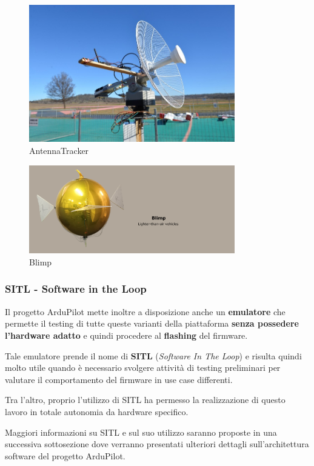 \documentclass[a4paper, 12pt, oneside]{article}
\theoremstyle{definition}
\begin{document}
\begin{figure}[H]
    \centering
    \includegraphics[width=0.8\textwidth]{images/antenna.jpg}
    \caption{AntennaTracker}
\end{figure}
\begin{figure}[H]
    \centering
    \includegraphics[width=0.8\textwidth]{images/blimp.png}
    \caption{Blimp}
\end{figure}

\subsubsection{SITL - Software in the Loop}
Il progetto ArduPilot mette inoltre a disposizione anche un \textbf{emulatore} che permette il testing di tutte queste varianti della piattaforma \textbf{senza possedere l'hardware adatto} \cite{sitl} e quindi procedere al \textbf{flashing} del firmware. 

Tale emulatore prende il nome di \textbf{SITL} (\textit{Software In The Loop}) e risulta quindi molto utile quando è necessario svolgere attività di testing preliminari per valutare il comportamento del firmware in use case differenti. 

Tra l'altro, proprio l'utilizzo di SITL ha permesso la realizzazione di questo lavoro in totale autonomia da hardware specifico. 

Maggiori informazioni su SITL e sul suo utilizzo saranno proposte in una successiva sottosezione dove verranno presentati ulteriori dettagli sull'architettura software del progetto ArduPilot.
\end{document}
